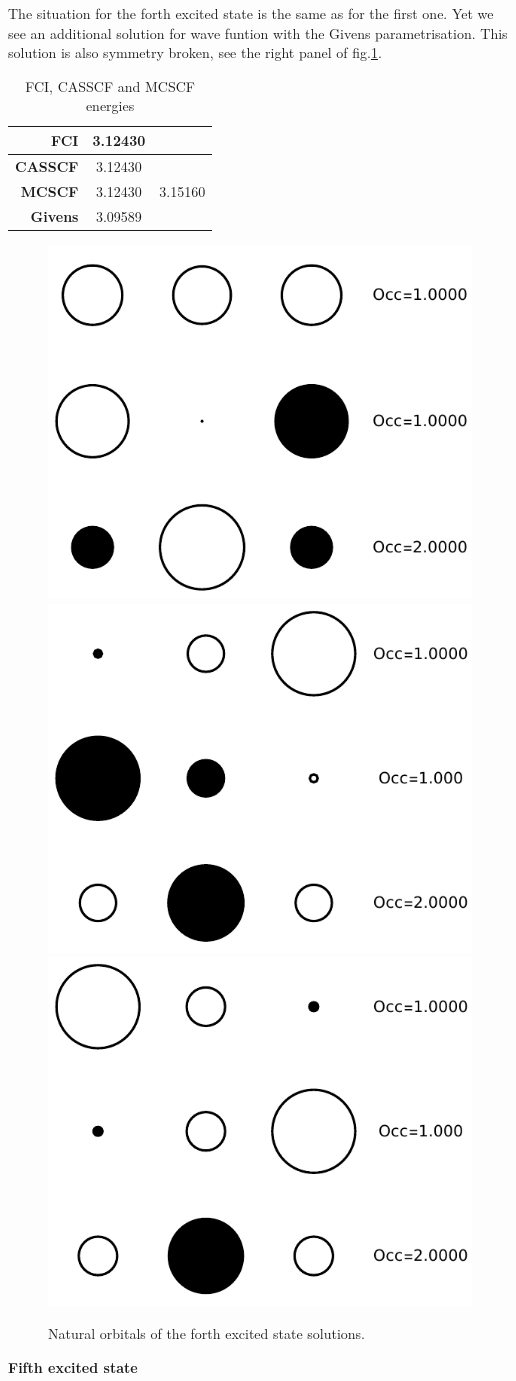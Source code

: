 \documentclass[11pt,a4paper]{article}
\begin{document}
The situation for the forth excited state is the same as for the first one. Yet we see an additional solution for wave funtion with the Givens parametrisation. This solution is also symmetry broken, see the right panel of fig.\ref{fig:H3_ES4_NO}.
\begin{table}
  \begin{center}
    \caption{FCI, CASSCF and MCSCF energies}
    \label{tab:table1}
    \begin{tabular}{r|c c}
      \textbf{FCI} & 3.12430 & \\
      \hline
      \textbf{CASSCF} & 3.12430 & \\
      \hline
      \textbf{MCSCF} & 3.12430 & 3.15160 \\
      \hline
      \textbf{Givens} & 3.09589 &
    \end{tabular}
  \end{center}
\end{table}
\begin{figure}
  \centering
  \includegraphics[width=0.28\linewidth]{Figures/H3_ES4_CAS_NO}
  \hspace{0.65cm}
  \includegraphics[width=0.28\linewidth]{Figures/H3_ES4_MC1_NO}
  \hspace{0.65cm}
  \includegraphics[width=0.28\linewidth]{Figures/H3_ES4_MC2_NO}
  \caption{
    Natural orbitals of the forth excited state solutions.
    \label{fig:H3_ES4_NO}}
\end{figure}

\textbf{Fifth excited state}
\end{document}
